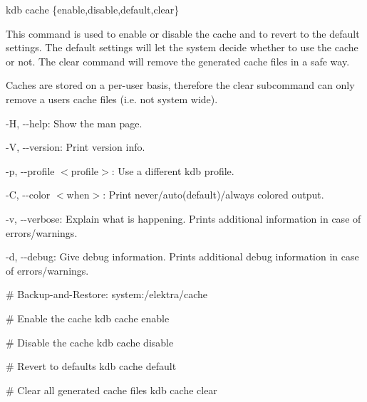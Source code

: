 {\ttfamily kdb cache \{enable,disable,default,clear\}}

This command is used to enable or disable the cache and to revert to the default settings. The default settings will let the system decide whether to use the cache or not. The clear command will remove the generated cache files in a safe way.

Caches are stored on a per-\/user basis, therefore the {\ttfamily clear} subcommand can only remove a user\textquotesingle{}s cache files (i.\+e. not system wide).


\begin{DoxyItemize}
\item {\ttfamily -\/H}, {\ttfamily -\/-\/help}\+: Show the man page.
\item {\ttfamily -\/V}, {\ttfamily -\/-\/version}\+: Print version info.
\item {\ttfamily -\/p}, {\ttfamily -\/-\/profile $<$profile$>$}\+: Use a different kdb profile.
\item {\ttfamily -\/C}, {\ttfamily -\/-\/color $<$when$>$}\+: Print never/auto(default)/always colored output.
\item {\ttfamily -\/v}, {\ttfamily -\/-\/verbose}\+: Explain what is happening. Prints additional information in case of errors/warnings.
\item {\ttfamily -\/d}, {\ttfamily -\/-\/debug}\+: Give debug information. Prints additional debug information in case of errors/warnings.
\end{DoxyItemize}


\begin{DoxyCode}
# Backup-and-Restore: system:/elektra/cache

# Enable the cache
kdb cache enable

# Disable the cache
kdb cache disable

# Revert to defaults
kdb cache default

# Clear all generated cache files
kdb cache clear
\end{DoxyCode}
 